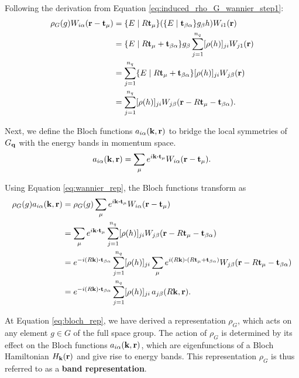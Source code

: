 Following the derivation from Equation \ref{eq:induced_rho_G_wannier_step1}:
\begin{align}
\rho_G(g) W_{i\alpha}({\vb{r}}-{\vb{t}}_\mu) &=
\{ E \mid R{\vb{t}}_\mu \} \qty(\{ E \mid {\vb{t}}_{\beta\alpha} \} g_\beta h) W_{i1}({\vb{r}}) \\
&= \{ E \mid R{\vb{t}}_\mu + {\vb{t}}_{\beta\alpha} \} g_\beta \sum_{j=1}^{n_q} [\rho(h)]_{ji} W_{j1}({\vb{r}}) \\
&= \sum_{j=1}^{n_q} \{ E \mid R{\vb{t}}_\mu + {\vb{t}}_{\beta\alpha} \} [\rho(h)]_{ji} W_{j\beta}({\vb{r}}) \\
&= \sum_{j=1}^{n_q} [\rho(h)]_{ji} W_{j\beta}({\vb{r}} - R{\vb{t}}_\mu - {\vb{t}}_{\beta\alpha}). \label{eq:wannier_rep}
\end{align}

\n

Next, we define the Bloch functions \(a_{i\alpha}({\vb{k}},{\vb{r}})\) to bridge the local symmetries of \(G_{\vb{q}}\) with the energy bands in momentum space.
\begin{equation} \label{eq:bloch_functions}
a_{i\alpha}(\k, \r) = \sum_{\mu} e^{i\k\vdot\t_\mu} W_{i\alpha}(\r-\t_\mu).
\end{equation}

Using Equation \ref{eq:wannier_rep}, the Bloch functions transform as
\begin{align}
\rho_G(g) a_{i\alpha}(\k,\r) &=
\rho_G(g) \sum_{\mu} e^{i\k\vdot\t_\mu} W_{i\alpha}(\r-\t_\mu) \\
&= \sum_{\mu} e^{i\k\vdot\t_\mu} \sum_{j=1}^{n_q} [\rho(h)]_{ji} W_{j\beta}(\r-R\t_\mu-\t_{\beta\alpha}) \\
& = e^{-i(R\k)\vdot\t_{\beta\alpha}} \sum_{j=1}^{n_q} [\rho(h)]_{ji} \sum_{\mu} e^{i(R\k)\vdot(R\t_\mu+\t_{\beta\alpha})} W_{j\beta}(\r-R\t_\mu-\t_{\beta\alpha}) \\
&= e^{-i(R\k)\vdot\t_{\beta\alpha}} \sum_{j=1}^{n_q} [\rho(h)]_{ji} \, a_{j\beta}(R\k, \r). \label{eq:bloch_rep}
\end{align}

At Equation \ref{eq:bloch_rep}, we have derived a representation \( \rho_G \), which acts on any element \( g \in G \) of the full space group. The action of \( \rho_G \) is determined by its effect on the Bloch functions \( a_{i\alpha}({\vb{k}}, {\vb{r}}) \), which are eigenfunctions of a Bloch Hamiltonian \( H_{\vb{k}}({\vb{r}}) \) and give rise to energy bands. This representation \( \rho_G \) is thus referred to as a \textbf{band representation}.

